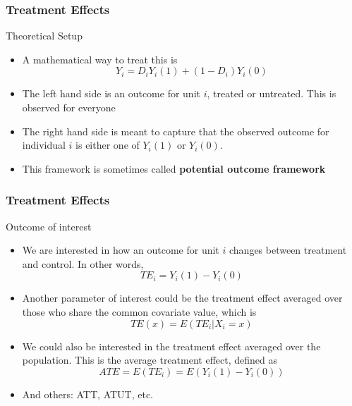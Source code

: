 \documentclass{beamer}
\begin{document}
\begin{frame}
\frametitle{Treatment Effects}
Theoretical Setup
\begin{itemize}
\item A mathematical way to treat this is 
\[
Y_i = D_iY_i(1) + (1-D_i)Y_i(0)
\]
\item The left hand side is an outcome for unit $i$, treated or untreated. This is observed for everyone
\item The right hand side is meant to capture that the observed outcome for individual $i$ is either one of $Y_i(1)$ or $Y_i(0)$. 
\item This framework is sometimes called \textbf{potential outcome framework} 
\end{itemize}
\end{frame}

\begin{frame}
\frametitle{Treatment Effects}
Outcome of interest
\begin{itemize}
\item We are interested in how an outcome for unit $i$ changes between treatment and control. In other words,
\[
TE_i = Y_i(1)-Y_i(0)
\]
\item Another parameter of interest could be the treatment effect averaged over those who share the common covariate value, which is
\[
TE(x) = E(TE_i|X_i=x)
\]
\item We could also be interested in the treatment effect averaged over the population. This is the average treatment effect, defined as
\[
ATE=E(TE_i)=E(Y_i(1)-Y_i(0))
\]
\item And others: ATT, ATUT, etc. 
\end{itemize}
\end{frame}
\end{document}
